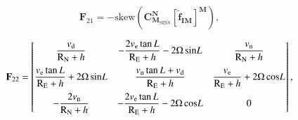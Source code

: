 \documentclass[3p]{elsarticle}
\begin{document}
\begin{equation}\label{F21}
{{\mathbf{F}}_{21}} = - \textrm{skew}\!\left(
{ {\mathbf{C}_{\mathbf{M}_{\text{SINS}}}^{\mathbf{N}} {\left[{\mathbf{\tilde f}}_{{\mathbf{IM}}}\right]}^{\mathbf{M}}}}
\right),
\end{equation}


	\begin{equation}\label{F22}
		{{\mathbf{F}}_{22}} =\begin{bmatrix}
			{\dfrac{{{{ v}_{\rm{d}}}}}{{{{\rm{R}}_{\rm{N}}} +  h}}} & -{\dfrac{{2{{ v}_{\rm{e}}}\tan  L}}{{{{\rm{R}}_{\rm{E}}} +  h}} - 2{\rm{\Omega \sin}} L} & {\dfrac{{{{ v}_{\rm{n}}}}}{{{{\rm{R}}_{\rm{N}}} +  h}}} \\[1em]
			{\dfrac{{{{ v}_{\rm{e}}}\tan  L}}{{{{\rm{R}}_{\rm{E}}} +  h}} + 2{\rm{\Omega \sin}} L} & {\dfrac{{{{ v}_{\rm{n}}}\tan  L + {{ v}_{\rm{d}}}}}{{{{\rm{R}}_{\rm{E}}} +  h}}} & {\dfrac{{{{ v}_{\rm{e}}}}}{{{{\rm{R}}_{\rm{E}}} +  h}} + 2{\rm{\Omega \cos}} L} \\[1em]
			{ - \dfrac{{2{{ v}_{\rm{n}}}}}{{{{\rm{R}}_{\rm{N}}} +  h}}} & { - \dfrac{{2{{ v}_{\rm{e}}}\tan  L}}{{{{\rm{R}}_{\rm{E}}} +  h}} - 2{\rm{\Omega \cos}} L} & 0
		\end{bmatrix},
	\end{equation}
\end{document}
